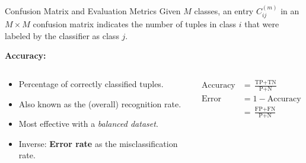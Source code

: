 \begin{frame}{Confusion Matrix and Evaluation Metrics}
	Given $M$ classes, an entry $C^{(m)}_{ij}$ in an $M \times M$ confusion matrix
	indicates the number of tuples in class $i$ that were labeled by the
	classifier as class $j$.
	

	\textbf{Accuracy:}
	\vspace*{-1em}
	\begin{columns}
		\begin{column}{0.55\textwidth}
			\begin{itemize}
				\item Percentage of correctly classified tuples.
				\item Also known as the (overall) recognition rate.
				\item Most effective with a \textit{balanced dataset}.
				\item Inverse: \textbf{Error rate} as the misclassification rate.
			\end{itemize}
		\end{column}
		\begin{column}{0.4\textwidth}
			\vspace*{-1.2em}
			\begin{align}
				\text{Accuracy}   & = \frac{\text{TP} + \text{TN}}{\text{P} +  \text{N}} \\
				\text{Error Rate} & = 1 - \text{Accuracy}                                \\
				                  & = \frac{\text{FP} + \text{FN}}{\text{P} + \text{N}}
			\end{align}
		\end{column}
	\end{columns}
\end{frame}


